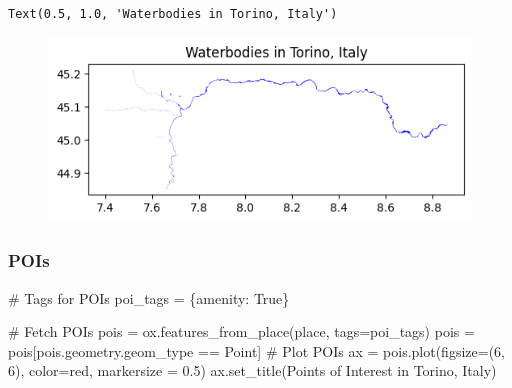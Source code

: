 \documentclass[
  letterpaper,
  DIV=11,
  numbers=noendperiod]{scrreprt}
\newenvironment{Shaded}{\begin{snugshade}}{\end{snugshade}}
\newcommand{\CommentTok}[1]{\textcolor[rgb]{0.37,0.37,0.37}{#1}}
\newcommand{\DecValTok}[1]{\textcolor[rgb]{0.68,0.00,0.00}{#1}}
\newcommand{\FloatTok}[1]{\textcolor[rgb]{0.68,0.00,0.00}{#1}}
\newcommand{\NormalTok}[1]{\textcolor[rgb]{0.00,0.23,0.31}{#1}}
\newcommand{\OperatorTok}[1]{\textcolor[rgb]{0.37,0.37,0.37}{#1}}
\newcommand{\StringTok}[1]{\textcolor[rgb]{0.13,0.47,0.30}{#1}}
\newcommand{\VariableTok}[1]{\textcolor[rgb]{0.07,0.07,0.07}{#1}}
\begin{document}
\begin{verbatim}
Text(0.5, 1.0, 'Waterbodies in Torino, Italy')
\end{verbatim}

\begin{figure}[H]

{\centering \includegraphics{labs/w07_OSM_files/figure-pdf/cell-44-output-2.png}

}

\end{figure}

\hypertarget{pois}{%
\subsubsection{POIs}\label{pois}}

\begin{Shaded}
\begin{Highlighting}[]
\CommentTok{\# Tags for POIs}
\NormalTok{poi\_tags }\OperatorTok{=}\NormalTok{ \{}\StringTok{\textquotesingle{}amenity\textquotesingle{}}\NormalTok{: }\VariableTok{True}\NormalTok{\}}

\CommentTok{\# Fetch POIs}
\NormalTok{pois }\OperatorTok{=}\NormalTok{ ox.features\_from\_place(place, tags}\OperatorTok{=}\NormalTok{poi\_tags)}
\NormalTok{pois }\OperatorTok{=}\NormalTok{ pois[pois.geometry.geom\_type }\OperatorTok{==} \StringTok{\textquotesingle{}Point\textquotesingle{}}\NormalTok{]}
\CommentTok{\# Plot POIs}
\NormalTok{ax }\OperatorTok{=}\NormalTok{ pois.plot(figsize}\OperatorTok{=}\NormalTok{(}\DecValTok{6}\NormalTok{, }\DecValTok{6}\NormalTok{), color}\OperatorTok{=}\StringTok{\textquotesingle{}red\textquotesingle{}}\NormalTok{, markersize }\OperatorTok{=} \FloatTok{0.5}\NormalTok{)}
\NormalTok{ax.set\_title(}\StringTok{\textquotesingle{}Points of Interest in Torino, Italy\textquotesingle{}}\NormalTok{)}
\end{Highlighting}
\end{Shaded}
\end{document}

